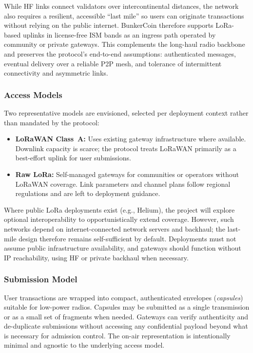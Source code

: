 \documentclass{article}
\begin{document}
While HF links connect validators over intercontinental distances, the network also requires a resilient, accessible ``last mile'' so users can originate transactions without relying on the public internet. BunkerCoin therefore supports LoRa-based uplinks in license-free ISM bands as an ingress path operated by community or private gateways. This complements the long-haul radio backbone and preserves the protocol’s end-to-end assumptions: authenticated messages, eventual delivery over a reliable P2P mesh, and tolerance of intermittent connectivity and asymmetric links.

\subsubsection{Access Models}

Two representative models are envisioned, selected per deployment context rather than mandated by the protocol:
\begin{itemize}
    \item \textbf{LoRaWAN Class~A:} Uses existing gateway infrastructure where available. Downlink capacity is scarce; the protocol treats LoRaWAN primarily as a best-effort uplink for user submissions.
    \item \textbf{Raw LoRa:} Self-managed gateways for communities or operators without LoRaWAN coverage. Link parameters and channel plans follow regional regulations and are left to deployment guidance.
\end{itemize}

Where public LoRa deployments exist (e.g., Helium), the project will explore optional interoperability to opportunistically extend coverage. However, such networks depend on internet-connected network servers and backhaul; the last-mile design therefore remains self-sufficient by default. Deployments must not assume public infrastructure availability, and gateways should function without IP reachability, using HF or private backhaul when necessary.

\subsubsection{Submission Model}

User transactions are wrapped into compact, authenticated envelopes (\emph{capsules}) suitable for low-power radios. Capsules may be submitted as a single transmission or as a small set of fragments when needed. Gateways can verify authenticity and de-duplicate submissions without accessing any confidential payload beyond what is necessary for admission control. The on-air representation is intentionally minimal and agnostic to the underlying access model.
\end{document}
